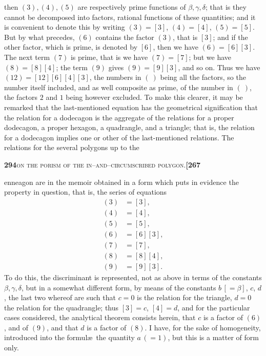 \documentclass[11pt]{article}
\begin{document}
then $(3), (4), (5)$ are respectively prime functions of $\beta, \gamma, \delta$; that is they cannot be decomposed into factors, rational functions of these quantities; and it is convenient to denote this by writing $(3) = [3]$, $(4) = [4]$, $(5) = [5]$. But by what precedes, $(6)$ contains the factor $(3)$, that is $[3]$; and if the other factor, which is prime, is denoted by $[6]$, then we have $(6) = [6][3]$. The next term $(7)$ is prime, that is we have $(7) = [7]$; but we have $(8) = [8][4]$; the term $(9)$ gives $(9) = [9][3]$, and so on. Thus we have $(12) = [12][6][4][3]$, the numbers in $(\ )$ being all the factors, so the number itself included, and as well composite as prime, of the number in $(\ )$, the factors $2$ and $1$ being however excluded. To make this clearer, it may be remarked that the last-mentioned equation has the geometrical signification that the relation for a dodecagon is the aggregate of the relations for a proper dodecagon, a proper hexagon, a quadrangle, and a triangle; that is, the relation for a dodecagon implies one or other of the last-mentioned relations. The relations for the several polygons up to the

\newpage
\setcounter{page}{294}

\noindent\textbf{294}\hfill\textsc{on the porism of the in--and--circumscribed polygon.}\hfill\textbf{[267}

\medskip

\noindent enneagon are in the memoir obtained in a form which puts in evidence the property in question, that is, the series of equations
\[
\begin{aligned}
   (3) &= [3],\\
   (4) &= [4],\\
   (5) &= [5],\\
   (6) &= [6][3],\\
   (7) &= [7],\\
   (8) &= [8][4],\\
   (9) &= [9][3].
\end{aligned}
\]
To do this, the discriminant is represented, not as above in terms of the constants $\beta, \gamma, \delta$, but in a somewhat different form, by means of the constants $b\,[=\beta]$, $c$, $d$, the last two whereof are such that $c = 0$ is the relation for the triangle, $d = 0$ the relation for the quadrangle; thus $[3] = c$, $[4] = d$, and for the particular cases considered, the analytical theorem consists herein, that $c$ is a factor of $(6)$, and of $(9)$, and that $d$ is a factor of $(8)$. I have, for the sake of homogeneity, introduced into the formul\ae\ the quantity $a\,(= 1)$, but this is a matter of form only.
\end{document}
